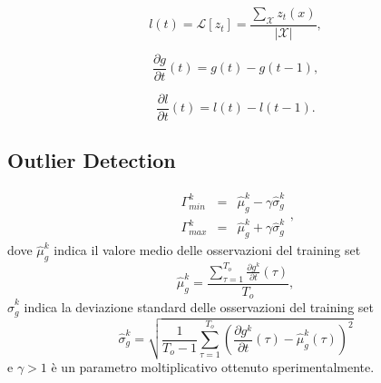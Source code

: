 \documentclass{llncs}
\begin{document}
\begin{equation}
\label{eq:energyLuma}
l(t) = \mathcal{L}[z_t] =\frac{\sum_{\mathcal{X}} z_t(x) }{|\mathcal{X}|} ,
\end{equation}  


\begin{equation}
\label{eq:gradientDetr}
\frac{\partial g}{\partial t}(t) = g(t) - g(t-1),
\end{equation}


\begin{equation}
\label{eq:lumaDetr}
\frac{\partial l}{\partial t}(t) = l(t) - l(t-1).
\end{equation}


\subsection{Outlier Detection}\label{subsec:MonitoringScheme}



\begin{equation}
\label{eq:soglieGradiente}
\begin{array}{lcl}
\Gamma_{min}^k & = & \hat{\mu}_g^k -\gamma \hat{\sigma}_g^k\\
\Gamma_{max}^k & = & \hat{\mu}_g^k + \gamma \hat{\sigma}_g^k
\end{array},
\end{equation}
dove $\hat{\mu}_g^k$ indica il valore medio delle osservazioni del training set
\begin{equation}
\hat{\mu}_g^k = \frac{\sum_{\tau = 1}^{T_{o}} \frac{\partial g^k}{\partial t}(\tau)}{T_{o}}, \nonumber
\end{equation}
$\hat{\sigma}_g^k$ indica la deviazione standard delle osservazioni del training set
\begin{equation}
\hat{\sigma}_g^k  = \sqrt{\frac{1}{T_{o}-1}\sum_{\tau=1}^{T_{o}}\left(\frac{\partial g^k}{\partial t}(\tau) - \hat{\mu}_g^k(\tau)\right)^2} \nonumber
\end{equation}
e $\gamma>1$ \`e un parametro moltiplicativo ottenuto sperimentalmente.\\
\end{document}
